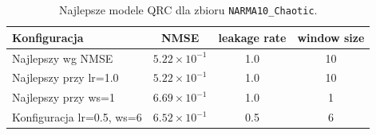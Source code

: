 \begin{table}[ht]
\centering
\caption{Najlepsze modele QRC dla zbioru \texttt{NARMA10\_Chaotic}.}
\label{tab:qrc-narma10_chaotic}
\begin{tabular}{lccc}
\toprule
Konfiguracja & NMSE & leakage rate & window size \\
\midrule
Najlepszy wg NMSE & $5.22 \times 10^{-1}$ & 1.0 & 10 \\
Najlepszy przy lr=1.0 & $5.22 \times 10^{-1}$ & 1.0 & 10 \\
Najlepszy przy ws=1 & $6.69 \times 10^{-1}$ & 1.0 & 1 \\
Konfiguracja lr=0.5, ws=6 & $6.52 \times 10^{-1}$ & 0.5 & 6 \\
\bottomrule
\end{tabular}
\end{table}
